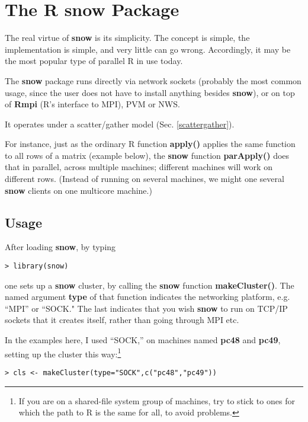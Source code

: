 \section{The R snow Package}
\label{snow}

The real virtue of {\bf snow} is its simplicity.  The concept is simple,
the implementation is simple, and very little can go wrong.
Accordingly, it may be the most popular type of parallel R in use today.

The {\bf snow} package runs directly via network sockets (probably the
most common usage, since the user does not have to install anything
besides {\bf snow}), or on top of {\bf Rmpi} (R's interface to MPI), PVM
or NWS.

It operates under a scatter/gather model (Sec.
\ref{scattergather}).

For instance, just as the ordinary R function {\bf apply()} applies the
same function to all rows of a matrix (example below), the {\bf snow}
function {\bf parApply()} does that in parallel, across multiple
machines; different machines will work on different rows.  (Instead of
running on several machines, we might one several {\bf snow} clients on
one multicore machine.)

\subsection{Usage}

After loading {\bf snow}, by typing

\begin{lstlisting}
> library(snow)
\end{lstlisting}

one sets up a {\bf snow} cluster, by calling the {\bf snow} function
{\bf makeCluster()}.  The named argument {\bf type} of that function
indicates the networking platform, e.g. ``MPI'' or ``SOCK." The last
indicates that you wish {\bf snow} to run on TCP/IP sockets that it
creates itself, rather than going through MPI etc.

In the examples here, I used ``SOCK,'' on machines named {\bf pc48} and
{\bf pc49}, setting up the cluster this way:\footnote{If you are on a
shared-file system group of machines, try to stick to ones for which the
path to R is the same for all, to avoid problems.}

\begin{lstlisting}
> cls <- makeCluster(type="SOCK",c("pc48","pc49"))
\end{lstlisting}


